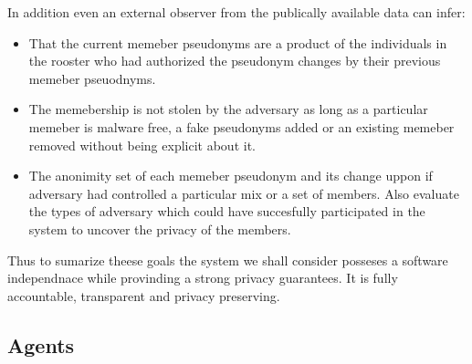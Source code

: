 \documentclass[12pt]{article}
\begin{document}
In addition even an external observer from the publically available data can infer:
\begin{itemize}
\item That the current memeber pseudonyms are a product of the individuals in the rooster who had authorized the pseudonym changes by their previous memeber pseuodnyms. 
\item The memebership is not stolen by the adversary as long as a particular memeber is malware free, a fake pseudonyms added or an existing memeber removed without being explicit about it.
\item The anonimity set of each memeber pseudonym and its change uppon if adversary had controlled a particular mix or a set of members. Also evaluate the types of adversary which could have succesfully participated in the system to uncover the privacy of the members. 
\end{itemize}

Thus to sumarize theese goals the system we shall consider posseses a software independnace while provinding a strong privacy guarantees. It is fully accountable, transparent and privacy preserving.


\subsection*{Agents}
\end{document}

